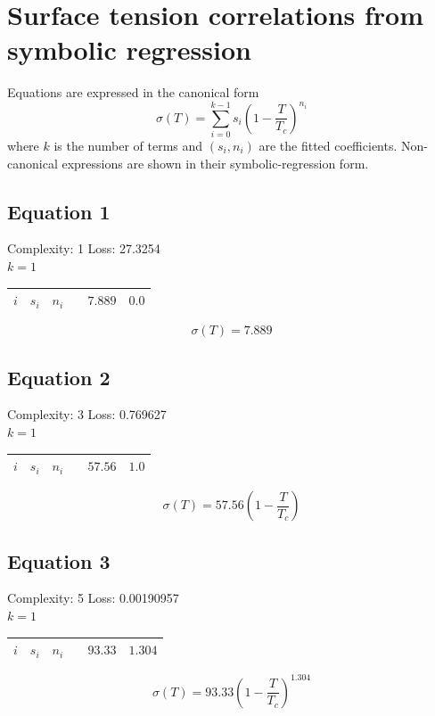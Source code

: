 \documentclass[11pt]{article}
\begin{document}
\section*{Surface tension correlations from symbolic regression}
\noindent Equations are expressed in the canonical form
\[
  \sigma(T) = \sum_{i=0}^{k-1} s_i \left(1 - \frac{T}{T_c}\right)^{\!n_i}
\]
where $k$ is the number of terms and $(s_i, n_i)$ are the fitted coefficients.
Non-canonical expressions are shown in their symbolic-regression form.

\subsection*{Equation 1}
\noindent Complexity: 1 \quad Loss: 27.3254 \\[4pt]
\noindent $k = 1$ \\[2pt]
\begin{center}
\begin{tabular}{ccc}
\toprule
$i$ & $s_i$ & $n_i$ \
 & $7.889$ & $0.0$ \\
\bottomrule
\end{tabular}
\end{center}
\[
\sigma(T) = 7.889
\]

\subsection*{Equation 2}
\noindent Complexity: 3 \quad Loss: 0.769627 \\[4pt]
\noindent $k = 1$ \\[2pt]
\begin{center}
\begin{tabular}{ccc}
\toprule
$i$ & $s_i$ & $n_i$ \
 & $57.56$ & $1.0$ \\
\bottomrule
\end{tabular}
\end{center}
\[
\sigma(T) = 57.56 \left(1 - \dfrac{T}{T_{\!c}}\right)
\]

\subsection*{Equation 3}
\noindent Complexity: 5 \quad Loss: 0.00190957 \\[4pt]
\noindent $k = 1$ \\[2pt]
\begin{center}
\begin{tabular}{ccc}
\toprule
$i$ & $s_i$ & $n_i$ \
 & $93.33$ & $1.304$ \\
\bottomrule
\end{tabular}
\end{center}
\[
\sigma(T) = 93.33 \left(1 - \dfrac{T}{T_{\!c}}\right)^{1.304}
\]
\end{document}
